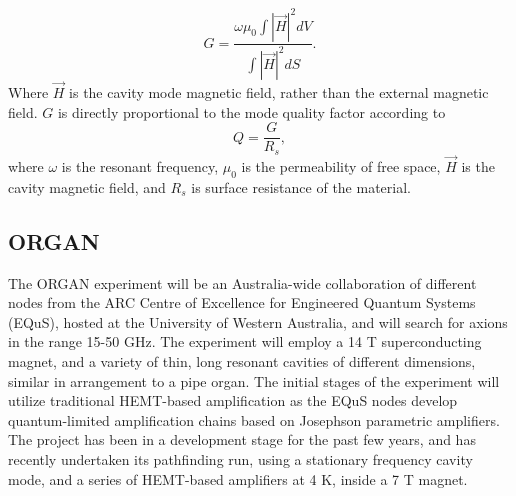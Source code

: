 \documentclass[preprint]{elsarticle}
\begin{document}
\begin{equation}
G=\frac{\omega\mu_0\int{|\vec{H}|^2dV}}{\int{|\vec{H}|^2dS}}.
\end{equation}
Where $\vec{H}$ is the cavity mode magnetic field, rather than the external magnetic field. $G$ is directly proportional to the mode quality factor according to
\begin{equation}
Q=\frac{G}{R_s},
\end{equation}
where $\omega$ is the resonant frequency, $\mu_0$ is the permeability of free space, $\vec{H}$ is the cavity magnetic field, and $R_s$ is surface resistance of the material.
\subsection{ORGAN}
The ORGAN experiment will be an Australia-wide collaboration of different nodes from the ARC Centre of Excellence for Engineered Quantum Systems (EQuS), hosted at the University of Western Australia, and will search for axions in the range 15-50 GHz. The experiment will employ a 14 T superconducting magnet, and a variety of thin, long resonant cavities of different dimensions, similar in arrangement to a pipe organ. The initial stages of the experiment will utilize traditional HEMT-based amplification as the EQuS nodes develop quantum-limited amplification chains based on Josephson parametric amplifiers. The project has been in a development stage for the past few years, and has recently undertaken its pathfinding run, using a stationary frequency cavity mode, and a series of HEMT-based amplifiers at 4 K, inside a 7 T magnet.
\end{document}

